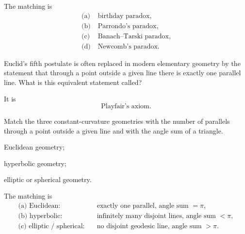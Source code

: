     \begin{solution}
        The matching is
        \[
            \boxed{
                \begin{aligned}
                    \text{(a)}\;&\text{birthday paradox},\\
                    \text{(b)}\;&\text{Parrondo's paradox},\\
                    \text{(c)}\;&\text{Banach--Tarski paradox},\\
                    \text{(d)}\;&\text{Newcomb's paradox}.
                \end{aligned}
            }
        \]
    \end{solution}

    \begin{expectedproblem}
        Euclid's fifth postulate is often replaced in modern elementary
        geometry by the statement that through a point outside a given line
        there is exactly one parallel line. What is this equivalent statement
        called?
    \end{expectedproblem}

    \begin{solution}
        It is
        \[
            \boxed{\text{Playfair's axiom}}.
        \]
    \end{solution}

    \begin{expectedproblem}
        Match the three constant-curvature geometries with the number of
        parallels through a point outside a given line and with the angle sum of
        a triangle.
        \begin{problemsubparts}
            \item Euclidean geometry;
            \item hyperbolic geometry;
            \item elliptic or spherical geometry.
        \end{problemsubparts}
    \end{expectedproblem}

    \begin{solution}
        The matching is
        \[
            \boxed{
                \begin{aligned}
                    \text{(a) Euclidean:}&\quad
                    \text{exactly one parallel, angle sum }=\pi,\\
                    \text{(b) hyperbolic:}&\quad
                    \text{infinitely many disjoint lines, angle sum }<\pi,\\
                    \text{(c) elliptic / spherical:}&\quad
                    \text{no disjoint geodesic line, angle sum }>\pi.
                \end{aligned}
            }
        \]
    \end{solution}

